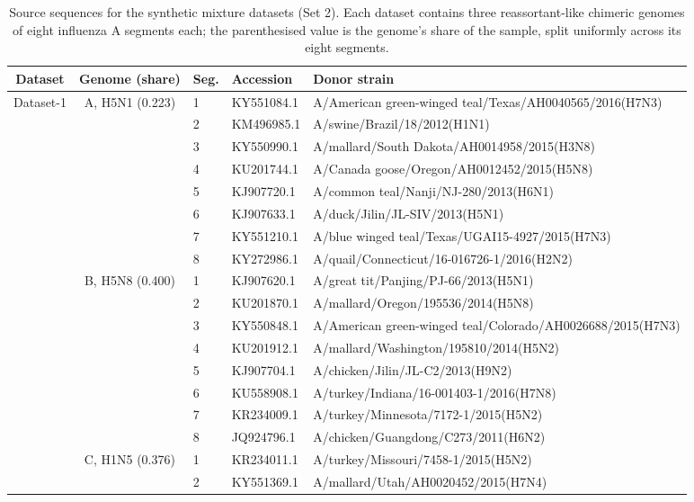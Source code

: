 \begin{table}[t]
\caption{Source sequences for the synthetic mixture datasets (Set 2). Each dataset contains three reassortant-like chimeric genomes of eight influenza A segments each; the parenthesised value is the genome's share of the sample, split uniformly across its eight segments.\label{tab:syn-mixed-sources}}
\centering
\footnotesize
\begin{tabular}{cclll}
\toprule
\textbf{Dataset} & \textbf{Genome (share)} & \textbf{Seg.} & \textbf{Accession} & \textbf{Donor strain} \\
\midrule
\multirow{24}{*}{Dataset-1} & \multirow{8}{*}{A, H5N1 (0.223)} & 1 & KY551084.1 & A/American green-winged teal/Texas/AH0040565/2016(H7N3) \\
 &  & 2 & KM496985.1 & A/swine/Brazil/18/2012(H1N1) \\
 &  & 3 & KY550990.1 & A/mallard/South Dakota/AH0014958/2015(H3N8) \\
 &  & 4 & KU201744.1 & A/Canada goose/Oregon/AH0012452/2015(H5N8) \\
 &  & 5 & KJ907720.1 & A/common teal/Nanji/NJ-280/2013(H6N1) \\
 &  & 6 & KJ907633.1 & A/duck/Jilin/JL-SIV/2013(H5N1) \\
 &  & 7 & KY551210.1 & A/blue winged teal/Texas/UGAI15-4927/2015(H7N3) \\
 &  & 8 & KY272986.1 & A/quail/Connecticut/16-016726-1/2016(H2N2) \\
\cmidrule(l){2-5}
 & \multirow{8}{*}{B, H5N8 (0.400)} & 1 & KJ907620.1 & A/great tit/Panjing/PJ-66/2013(H5N1) \\
 &  & 2 & KU201870.1 & A/mallard/Oregon/195536/2014(H5N8) \\
 &  & 3 & KY550848.1 & A/American green-winged teal/Colorado/AH0026688/2015(H7N3) \\
 &  & 4 & KU201912.1 & A/mallard/Washington/195810/2014(H5N2) \\
 &  & 5 & KJ907704.1 & A/chicken/Jilin/JL-C2/2013(H9N2) \\
 &  & 6 & KU558908.1 & A/turkey/Indiana/16-001403-1/2016(H7N8) \\
 &  & 7 & KR234009.1 & A/turkey/Minnesota/7172-1/2015(H5N2) \\
 &  & 8 & JQ924796.1 & A/chicken/Guangdong/C273/2011(H6N2) \\
\cmidrule(l){2-5}
 & \multirow{8}{*}{C, H1N5 (0.376)} & 1 & KR234011.1 & A/turkey/Missouri/7458-1/2015(H5N2) \\
 &  & 2 & KY551369.1 & A/mallard/Utah/AH0020452/2015(H7N4) \\

\end{tabular}
\end{table}

